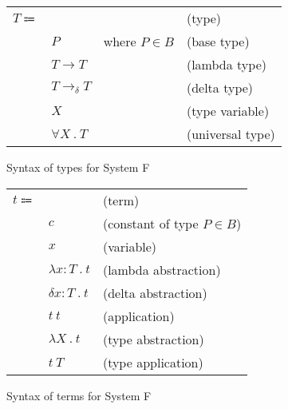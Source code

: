 \documentclass[acmlarge]{acmart}
\begin{document}
  \newcommand\labs[2]{\lambda #1 \ . \ #2}
  \newcommand\dabs[2]{\delta #1 \ . \ #2}
  \newcommand\lapp[2]{#1 \ #2}
  \newcommand\lsub[3]{#1 \left[ #2 \mapsto #3 \right]}
  \newcommand\lprovide[2]{\text{provide } #1 \text{ in } #2}

  \newcommand\evalsto[2]{#1 \longrightarrow #2}

  \newcommand\tarrow[2]{#1 \rightarrow #2}
  \newcommand\tforall[2]{\forall #1 \ . \ #2}

  \begin{figure}[h!]
    \begin{mdframed}

      \begin{tabular}{l l l l}
        $T \Coloneqq $ & & & (type) \\
        & $P$ & where $P \in B$ & (base type) \\
        & $T \rightarrow T$ & & (lambda type) \\
        & $T \rightarrow_{\delta} T$ & & (delta type) \\
        & $X$ & & (type variable) \\
        & $\tforall{X}{T}$ & & (universal type) \\
      \end{tabular}

    \end{mdframed}
    \caption{Syntax of types for System F}
    \label{fig:system_f_types_syntax}
  \end{figure}

  \begin{figure}[h!]
    \begin{mdframed}

      \begin{tabular}{l l l}
        $t \Coloneqq $ & & (term) \\
        & $c$ & (constant of type $P \in B$) \\
        & $x$ & (variable) \\
        & $\labs{x : T}{t}$ & (lambda abstraction) \\
        & $\dabs{x : T}{t}$ & (delta abstraction) \\
        & $\lapp{t}{t}$ & (application) \\
        & $\labs{X}{t}$ & (type abstraction) \\
        & $\lapp{t}{T}$ & (type application) \\
      \end{tabular}

    \end{mdframed}
    \caption{Syntax of terms for System F}
    \label{fig:system_f_terms_syntax}
  \end{figure}
\end{document}
